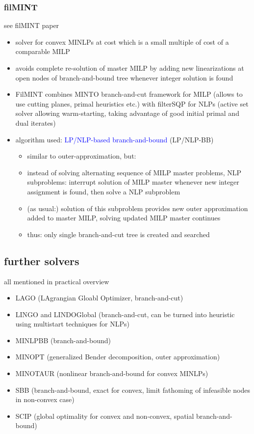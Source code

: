 \documentclass{article}
\begin{document}
\subsubsection{filMINT}
see filMINT paper \cite{abhishek2010filmint}
\begin{itemize}
\item solver for convex MINLPs at cost which is a small multiple of cost of a comparable MILP
\item avoids complete re-solution of master MILP by adding new linearizations at open nodes of branch-and-bound tree whenever integer solution is found
\item FilMINT combines MINTO branch-and-cut framework for MILP (allows to use cutting planes, primal heuristics etc.)  with filterSQP for NLPs (active set solver allowing warm-starting, taking advantage of good initial primal and dual iterates)
\item algorithm used: \textcolor{blue}{LP/NLP-based branch-and-bound} (LP/NLP-BB) \cite{quesada1992lp}
\begin{itemize}
\item similar to outer-approximation, but:
\item instead of solving alternating sequence of MILP master problems, NLP subproblems: interrupt solution of MILP master whenever new integer assignment is found, then solve a NLP subproblem
\item (as usual:) solution of this subproblem provides new outer approximation added to master MILP, solving updated MILP master continues
\item thus: only single branch-and-cut tree is created and searched
\end{itemize}
\end{itemize}

\subsection{further solvers}
all mentioned in practical overview \cite{d2013mixed}
\begin{itemize}
\item LAGO (LAgrangian Gloabl Optimizer, branch-and-cut)
\item LINGO and LINDOGlobal (branch-and-cut, can be turned into heuristic using multistart techniques for NLPs)
\item MINLPBB (branch-and-bound)
\item MINOPT (generalized Bender decomposition, outer approximation)
\item MINOTAUR (nonlinear branch-and-bound for convex MINLPs)
\item SBB (branch-and-bound, exact for convex, limit fathoming of infeasible nodes in non-convex case)
\item SCIP (global optimality for convex and non-convex, spatial branch-and-bound)
\end{itemize}
\end{document}
